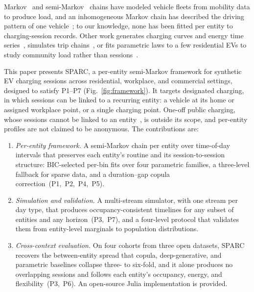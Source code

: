 \documentclass[journal]{IEEEtran}
\begin{document}
Markov~\cite{shepero2018} and semi-Markov~\cite{rolink2013} chains have modeled vehicle fleets from mobility data to produce load, and an inhomogeneous Markov chain has described the driving pattern of one vehicle~\cite{iversen2016inhomogeneous}; to our knowledge, none has been fitted per entity to charging-session records. Other work generates charging curves and energy time series~\cite{li2024diffcharge,razghandi2023,lin2025energydiff,hu2023multiload}, simulates trip chains~\cite{tang2024modeling,xiong2026llm}, or fits parametric laws to a few residential EVs to study community load rather than sessions~\cite{wang2026identification}.

This paper presents SPARC, a per-entity semi-Markov framework for synthetic EV charging sessions across residential, workplace, and commercial settings, designed to satisfy P1--P7 (Fig.~\ref{fig:framework}). It targets designated charging, in which sessions can be linked to a recurring entity: a vehicle at its home or assigned workplace point, or a single charging point. One-off public charging, whose sessions cannot be linked to an entity~\cite{jonas2023electric}, is outside its scope, and per-entity profiles are not claimed to be anonymous. The contributions are:
\begin{enumerate}
\item \emph{Per-entity framework.} A semi-Markov chain per entity over time-of-day intervals that preserves each entity's routine and its session-to-session structure: BIC-selected per-bin fits over four parametric families, a three-level fallback for sparse data, and a duration--gap copula correction~(P1,~P2,~P4,~P5).
\item \emph{Simulation and validation.} A multi-stream simulator, with one stream per day type, that produces occupancy-consistent timelines for any subset of entities and any horizon~(P3,~P7), and a four-level protocol that validates them from entity-level marginals to population distributions.
\item \emph{Cross-context evaluation.} On four cohorts from three open datasets, SPARC recovers the between-entity spread that copula, deep-generative, and parametric baselines collapse three- to six-fold, and it alone produces no overlapping sessions and follows each entity's occupancy, energy, and flexibility~(P3,~P6). An open-source Julia implementation is provided.
\end{enumerate}
\end{document}
